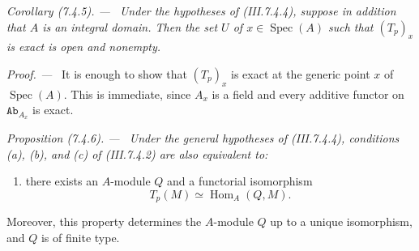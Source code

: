 \documentclass[10pt,oneside]{book}
\newcommand{\cat}[1]{\mathtt{#1}}
\newcommand{\Spec}{\operatorname{Spec}}
\newcommand{\Hom}{\operatorname{Hom}}
\newcommand{\sref}[2][]{(#2)}
\newenvironment{proposition}[1][]{\par\medskip\noindent\itshape Proposition (#1). ---\ }{\par}
\newenvironment{corollary}[1][]{\par\medskip\noindent\itshape Corollary (#1). ---\ }{\par}
\newenvironment{proof}{\par\medskip\noindent\textit{Proof. ---\ }}{\par}
\begin{document}
\begin{corollary}[7.4.5]
\label{III.7.4.5}
Under the hypotheses of \sref{III.7.4.4}, suppose in addition
that $A$ is an integral domain.  Then the set $U$ of
$x\in\Spec(A)$ such that $(T_p)_x$ is exact is open and
nonempty.
\end{corollary}

\begin{proof}
It is enough to show that $(T_p)_x$ is exact at the generic
point $x$ of $\Spec(A)$.  This is immediate, since $A_x$ is a
field and every additive functor on $\cat{Ab}_{A_x}$ is exact.
\end{proof}

\begin{proposition}[7.4.6]
\label{III.7.4.6}
Under the general hypotheses of \sref{III.7.4.4}, conditions
(a), (b), and (c) of \sref{III.7.4.2} are also equivalent to:
\begin{enumerate}
  \item[(d)] there exists an $A$-module $Q$ and a functorial
    isomorphism
    \[
      T_p(M)\simeq\Hom_A(Q,M).
      \tag{7.4.6.1}\label{III.7.4.6.1.eq}
    \]
\end{enumerate}
Moreover, this property determines the $A$-module $Q$ up to a
unique isomorphism, and $Q$ is of finite type.
\end{proposition}
\end{document}

